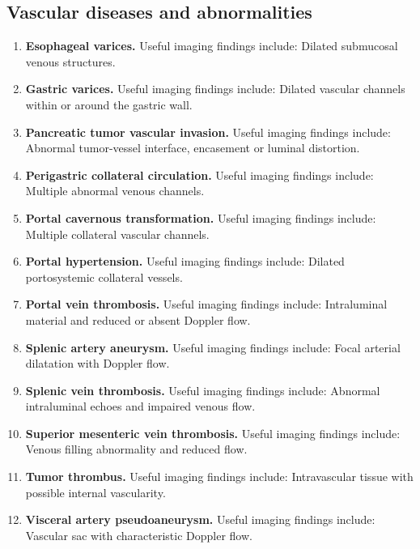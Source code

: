 \subsection{Vascular diseases and abnormalities}
\begin{enumerate}[leftmargin=*,itemsep=0.45em,topsep=0.4em]
\item \textbf{Esophageal varices.} Useful imaging findings include: Dilated submucosal venous structures.
\item \textbf{Gastric varices.} Useful imaging findings include: Dilated vascular channels within or around the gastric wall.
\item \textbf{Pancreatic tumor vascular invasion.} Useful imaging findings include: Abnormal tumor-vessel interface, encasement or luminal distortion.
\item \textbf{Perigastric collateral circulation.} Useful imaging findings include: Multiple abnormal venous channels.
\item \textbf{Portal cavernous transformation.} Useful imaging findings include: Multiple collateral vascular channels.
\item \textbf{Portal hypertension.} Useful imaging findings include: Dilated portosystemic collateral vessels.
\item \textbf{Portal vein thrombosis.} Useful imaging findings include: Intraluminal material and reduced or absent Doppler flow.
\item \textbf{Splenic artery aneurysm.} Useful imaging findings include: Focal arterial dilatation with Doppler flow.
\item \textbf{Splenic vein thrombosis.} Useful imaging findings include: Abnormal intraluminal echoes and impaired venous flow.
\item \textbf{Superior mesenteric vein thrombosis.} Useful imaging findings include: Venous filling abnormality and reduced flow.
\item \textbf{Tumor thrombus.} Useful imaging findings include: Intravascular tissue with possible internal vascularity.
\item \textbf{Visceral artery pseudoaneurysm.} Useful imaging findings include: Vascular sac with characteristic Doppler flow.
\end{enumerate}

